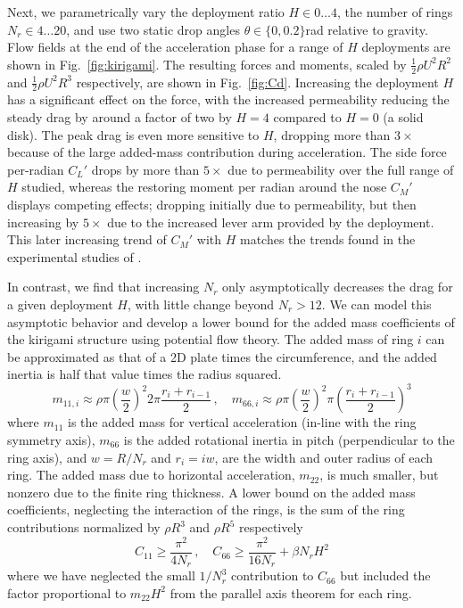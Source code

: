 \documentclass[lineno]{JFM-FLM_Au}
\begin{document}
Next, we parametrically vary the deployment ratio $H \in 0\ldots 4$, the number of rings $N_r \in 4\ldots20$, and use two static drop angles $\theta \in \{0,0.2\}$rad relative to gravity. Flow fields at the end of the acceleration phase for a range of $H$ deployments are shown in Fig.~\ref{fig:kirigami}. The resulting forces and moments, scaled by $\frac 12 \rho U^2 R^2$ and $\frac 12 \rho U^2 R^3$ respectively, are shown in Fig.~\ref{fig:Cd}. Increasing the deployment $H$ has a significant effect on the force, with the increased permeability reducing the steady drag by around a factor of two by $H=4$ compared to $H=0$ (a solid disk). The peak drag is even more sensitive to $H$, dropping more than $3\times$ because of the large added-mass contribution during acceleration. The side force per-radian $C_L'$ drops by more than $5\times$ due to permeability over the full range of $H$ studied, whereas the restoring moment per radian around the nose $C_M'$ displays competing effects; dropping initially due to permeability, but then increasing by $5\times$ due to the increased lever arm provided by the deployment. This later increasing trend of $C_M'$ with $H$ matches the trends found in the experimental studies of \cite{Lamoureux2025Kirigami-inspiredReconfiguration}.

In contrast, we find that increasing $N_r$ only asymptotically decreases the drag for a given deployment $H$, with little change beyond $N_r>12$. We can model this asymptotic behavior and develop a lower bound for the added mass coefficients of the kirigami structure using potential flow theory. The added mass of ring $i$ can be approximated as that of a 2D plate times the circumference, and the added inertia is half that value times the radius squared.
\begin{equation}
    m_{11,i} \approx \rho \pi\left(\frac w 2\right)^2 2\pi \frac{r_i+r_{i-1}}2\,,\quad  m_{66,i} \approx \rho \pi\left(\frac w 2\right)^2 \pi \left(\frac{r_i+r_{i-1}}2\right)^3
\end{equation}
where $m_{11}$ is the added mass for vertical acceleration (in-line with the ring symmetry axis), $m_{66}$ is the added rotational inertia in pitch (perpendicular to the ring axis), and $w = R/N_r$ and $r_i=iw$, are the width and outer radius of each ring. The added mass due to horizontal acceleration, $m_{22}$, is much smaller, but nonzero due to the finite ring thickness.
A lower bound on the added mass coefficients, neglecting the interaction of the rings,  is the sum of the ring contributions normalized by $\rho R^3$ and $\rho R^5$ respectively
\begin{equation}\label{eq:C11_C66}
    C_{11} \ge \frac{\pi^2}{4N_r}\,,\quad C_{66} \ge \frac {\pi^2} {16N_r} + \beta N_r H^2
\end{equation}
where we have neglected the small $1/N_r^3$ contribution to $C_{66}$ but included the factor proportional to $m_{22}H^2$ from the parallel axis theorem for each ring.
\end{document}
